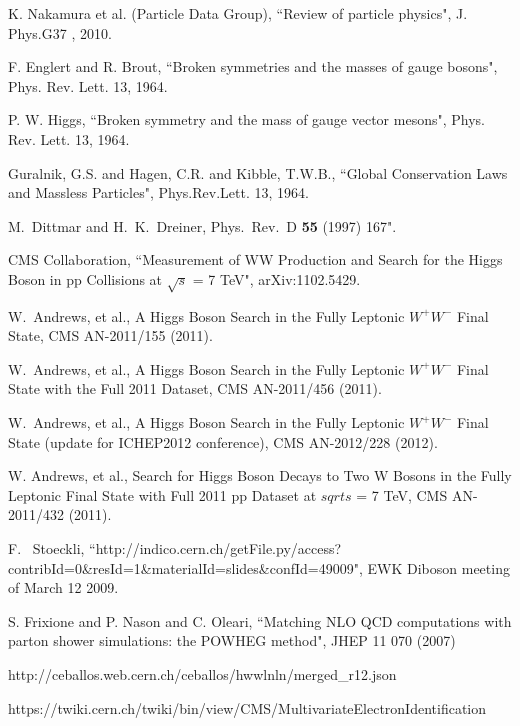 \clearpage

\vspace*{-0.2cm}

 K. Nakamura et al. (Particle Data Group), ``Review of particle physics", J. Phys.G37 , 2010.

F. Englert and R. Brout, ``Broken symmetries and the masses of gauge bosons", Phys. Rev. Lett. 13,  1964.

P. W. Higgs, ``Broken symmetry and the mass of gauge vector mesons", Phys. Rev. Lett. 13, 1964.

Guralnik, G.S. and Hagen, C.R. and Kibble, T.W.B., ``Global Conservation Laws and Massless Particles", 
Phys.Rev.Lett. 13, 1964.

M.~Dittmar and H.~K.~Dreiner, Phys.\ Rev.\  D {\bf 55} (1997) 167".

CMS Collaboration, ``Measurement of WW Production and Search for the Higgs Boson in 
pp Collisions at $\sqrt{s}$ = 7 TeV", arXiv:1102.5429.

W.~Andrews, et al., A Higgs Boson Search in the Fully Leptonic $W^+W^-$ Final State, CMS AN-2011/155 (2011).

W.~Andrews, et al., A Higgs Boson Search in the Fully Leptonic $W^+W^-$ Final State with the Full 2011 Dataset, CMS AN-2011/456 (2011).

W.~Andrews, et al., A Higgs Boson Search in the Fully Leptonic $W^+W^-$ Final State (update for ICHEP2012 conference), CMS AN-2012/228 (2012).

W. Andrews, et al., Search for Higgs Boson Decays to Two W Bosons in the Fully Leptonic Final State with Full 2011 pp Dataset at $sqrt{s}$ = 7 TeV, CMS AN-2011/432 (2011).

F.~ Stoeckli, ``http://indico.cern.ch/getFile.py/access?contribId=0\&resId=1\&materialId=slides\&confId=49009", 
EWK Diboson meeting of March 12 2009.

S. Frixione and P. Nason and C. Oleari, 
``Matching {NLO QCD} computations with parton shower simulations: the {POWHEG} method",
  JHEP 11 070 (2007)

http://ceballos.web.cern.ch/ceballos/hwwlnln/merged\_r12.json

https://twiki.cern.ch/twiki/bin/view/CMS/MultivariateElectronIdentification

